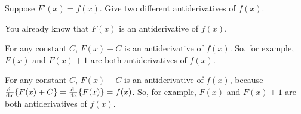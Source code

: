 \begin{question} Suppose $F'(x)=f(x)$. Give two different antiderivatives of $f(x)$.
\end{question}
\begin{hint}
You already know that $F(x)$ is an antiderivative of $f(x)$.
\end{hint}
\begin{answer}
For any constant $C$, $F(x)+C$ is an antiderivative of $f(x)$. So, for example, $F(x)$ and $F(x)+1$ are both antiderivatives of $f(x)$.
\end{answer}
\begin{solution}
For any constant $C$, $F(x)+C$ is an antiderivative of $f(x)$, because $\diff{}{x}\{F(x)+C\} = \diff{}{x}\{F(x)\} = f(x)$. So, for example, $F(x)$ and $F(x)+1$ are both antiderivatives of $f(x)$.
\end{solution}


